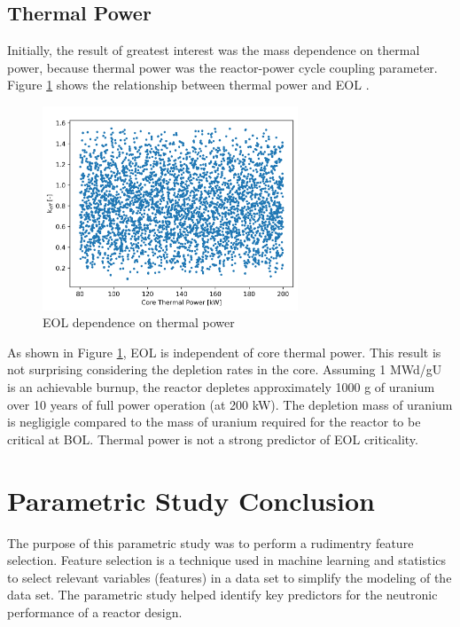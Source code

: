 \subsection{Thermal Power}
Initially, the result of greatest interest was the mass dependence on thermal
power, because thermal power was the reactor-power cycle coupling parameter.
Figure \ref{fig:eol_keff_vs_power} shows the relationship between thermal power
and EOL \keff.

\begin{figure}[h]
    \centering
    \includegraphics[width=3in]{../images/keff_vs_power.png}
\caption{EOL \keff dependence on thermal power}
\label{fig:eol_keff_vs_power}
\end{figure}

As shown in Figure \ref{fig:eol_keff_vs_power}, EOL \keff is independent of core
thermal power. This result is not surprising considering the depletion rates in
the core. Assuming 1 MWd/gU is an achievable burnup, the reactor depletes
approximately 1000 g of uranium over 10 years of full power operation (at 200
kW). The depletion mass
of uranium is negligigle compared to the mass of uranium required for the
reactor to be critical at BOL. Thermal power is not a strong predictor of EOL
criticality.


\section{Parametric Study Conclusion}
The purpose of this parametric study was to perform a rudimentry feature
selection. Feature selection is a technique used in machine learning and
statistics to select relevant variables (features) in a data set to simplify the
modeling of the data set. The parametric study helped identify key predictors
for the neutronic performance of a reactor design.

